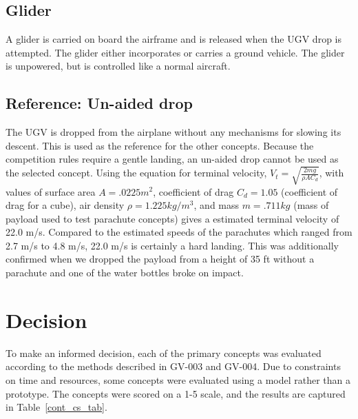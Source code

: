 \documentclass[]{auvsi_doc}
\begin{document}
\subsection{Glider}
A glider is carried on board the airframe and is released when the UGV drop is attempted. The glider either incorporates or carries a ground vehicle. The glider is unpowered, but is controlled like a normal aircraft. 

\subsection{Reference: Un-aided drop} 
The UGV is dropped from the airplane without any mechanisms for slowing its descent. This is used as the reference for the other concepts. Because the competition rules require a gentle landing, an un-aided drop cannot be used as the selected concept. Using the equation for terminal velocity, $V_t = \sqrt{\frac{2mg}{\rho A C_d}}$, with values of  surface area $A = .0225 m^2$, coefficient of drag $C_d = 1.05$ (coefficient of drag for a cube), air density $\rho = 1.225 kg/m^3$, and mass $m = .711 kg$ (mass of payload used to test parachute concepts) gives a estimated terminal velocity of 22.0 m/s. Compared to the estimated speeds of the parachutes which ranged from 2.7 m/s to 4.8 m/s, 22.0 m/s is certainly a hard landing. This was additionally confirmed when we dropped the payload from a height of 35 ft without a parachute and one of the water bottles broke on impact.

\section{Decision}
To make an informed decision, each of the primary concepts was evaluated according to the methods described in GV-003 and GV-004. 
Due to constraints on time and resources, some concepts were evaluated using a model rather than a prototype. 
The concepts were scored on a 1-5 scale, and the results are captured in Table~\ref{cont_cs_tab}.
\end{document}

